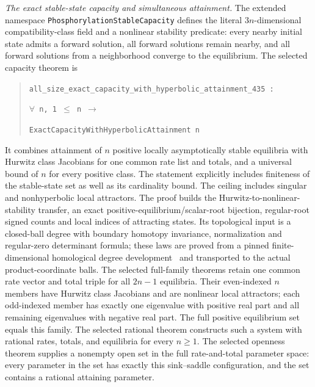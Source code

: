 \emph{The exact stable-state capacity and simultaneous attainment.} The extended namespace
\texttt{PhosphorylationStableCapacity} defines the literal \(3n\)-dimensional
compatibility-class field and a nonlinear stability predicate: every nearby initial state
admits a forward solution, all forward solutions remain nearby, and all forward solutions
from a neighborhood converge to the equilibrium. The selected capacity theorem is
\begin{quote}
\texttt{all\_size\_exact\_capacity\_with\_hyperbolic\_attainment\_435 :}\par
\texttt{\(\forall\) n, 1 \(\le\) n \(\to\)}\par
\texttt{ExactCapacityWithHyperbolicAttainment n}
\end{quote}
It combines attainment of \(n\) positive locally asymptotically stable equilibria with
Hurwitz class Jacobians for one common rate list and totals, and a universal bound of
\(n\) for every positive class.
The statement explicitly includes finiteness of the stable-state set as well as its
cardinality bound. The ceiling includes singular and nonhyperbolic local attractors.
The proof builds the
Hurwitz-to-nonlinear-stability transfer, an exact positive-equilibrium/scalar-root bijection,
regular-root signed counts and local indices of attracting states. Its topological input is
a closed-ball degree with boundary homotopy invariance, normalization and regular-zero
determinant formula; these laws are proved from a pinned finite-dimensional homological
degree development~\cite{LeanDifferentialGeometry} and transported to the actual
product-coordinate balls. The selected full-family theorems retain one common rate
vector and total triple for all \(2n-1\) equilibria. Their even-indexed \(n\)
members have Hurwitz class Jacobians and are nonlinear local attractors; each
odd-indexed member has exactly one eigenvalue with positive real part and all
remaining eigenvalues with negative real part. The full positive equilibrium set
equals this family. The selected rational theorem constructs such a system with
rational rates, totals, and equilibria for every \(n\ge1\). The selected openness
theorem supplies a nonempty open set in the full rate-and-total parameter space:
every parameter in the set has exactly this sink--saddle configuration, and the
set contains a rational attaining parameter.

